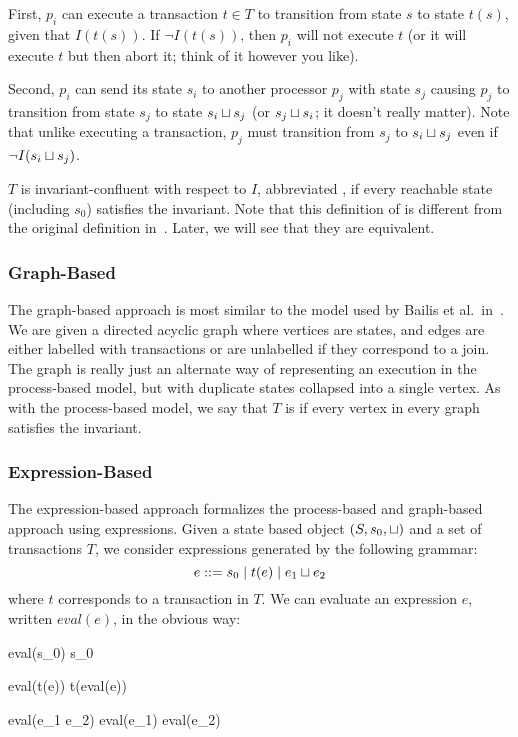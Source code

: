 First, $p_i$ can execute a transaction $t \in T$ to transition from state $s$
to state $t(s)$, given that $I(t(s))$. If $\lnot I(t(s))$, then $p_i$ will not
execute $t$ (or it will execute $t$ but then abort it; think of it however you
like).

Second, $p_i$ can send its state $s_i$ to another processor $p_j$ with state
$s_j$ causing $p_j$ to transition from state $s_j$ to state $s_i \sqcup s_j$ (or
$s_j \sqcup s_i$; it doesn't really matter). Note that unlike executing a
transaction, $p_j$ must transition from $s_j$ to $s_i \sqcup s_j$ even if $\lnot
I(s_i \sqcup s_j)$.

$T$ is invariant-confluent with respect to $I$, abbreviated \Iconfluent{}, if
every reachable state (including $s_0$) satisfies the invariant. Note that this
definition of \Iconfluence{} is different from the original definition
in~\cite{bailis2014coordination}. Later, we will see that they are equivalent.

\subsubsection{Graph-Based}
The graph-based approach is most similar to the model used by Bailis et al.\
in~\cite{bailis2014coordination}. We are given a directed acyclic graph where
vertices are states, and edges are either labelled with transactions or are
unlabelled if they correspond to a join. The graph is really just an alternate
way of representing an execution in the process-based model, but with duplicate
states collapsed into a single vertex. As with the process-based model, we say
that $T$ is \Iconfluent{} if every vertex in every graph satisfies the
invariant.

\subsubsection{Expression-Based}
The expression-based approach formalizes the process-based and graph-based
approach using expressions. Given a state based object $(S, s_0, \sqcup)$ and a
set of transactions $T$, we consider expressions generated by the following
grammar:
\[
  e ::= s_0 \mid t(e) \mid e_1 \sqcup e_2
\]
where $t$ corresponds to a transaction in $T$. We can evaluate an expression
$e$, written $eval(e)$, in the obvious way:
\begin{mathpar}
  eval(s_0)  s_0

  eval(t(e))  t(eval(e))

  eval(e_1 \join e_2)  eval(e_1) \join eval(e_2)
\end{mathpar}

